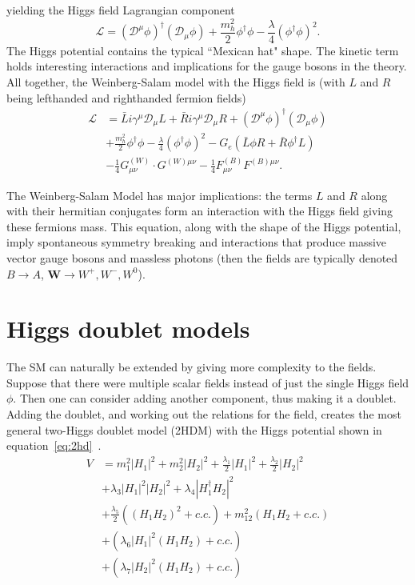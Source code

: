 yielding the Higgs field Lagrangian component 
\begin{equation}\mathcal{L} = (\mathcal{D}^\mu \phi)^\dag (\mathcal{D}_\mu \phi) + \frac{m^2_h}{2}\phi^\dag \phi - \frac{\lambda}{4}(\phi^\dag\phi)^2 \text{.}\end{equation} 
The Higgs potential contains the typical ``Mexican hat" shape. The kinetic term holds interesting interactions and implications for the gauge bosons in the theory. 
All together, the Weinberg-Salam model with the Higgs field is (with $L$ and $R$ being lefthanded and righthanded fermion fields)~\cite{Lancaster:1629337}
\begin{align}
\label{eq:ws}
\mathcal{L} &= \bar{L}i \gamma^\mu \mathcal{D}_\mu L +\bar{R}i \gamma^\mu \mathcal{D}_\mu R + (\mathcal{D}^\mu \phi)^\dag(\mathcal{D}_\mu\phi)  \\
            &+\frac{m^2_h}{2}\phi^\dag \phi - \frac{\lambda}{4}(\phi^\dag\phi)^2 - G_e(\bar{L}\phi R +\bar{R}\phi^\dag L)\nonumber \\
            &-\frac{1}{4}G^{(W)}_{\mu\nu}\cdot G^{(W)\mu\nu} - \frac{1}{4}F^{(B)}_{\mu\nu} F^{(B)\mu\nu}    \text{.} 
\end{align}

The Weinberg-Salam Model has major implications: the terms $L$ and $R$ along with their hermitian conjugates form an interaction with the Higgs field giving these fermions mass. 
This equation, along with the shape of the Higgs potential, imply spontaneous symmetry breaking and interactions that produce massive vector gauge bosons and massless photons (then the fields are typically denoted $B \rightarrow A$, $\bm{W}\rightarrow W^+,W^-,W^0$). 

\section{Higgs doublet models}
The SM can naturally be extended by giving more complexity to the fields. 
Suppose that there were multiple scalar fields instead of just the single Higgs field $\phi$. Then one can consider adding another component, thus making it a doublet. Adding the doublet, and working out the relations for the field, creates the most general two-Higgs doublet model (2HDM) with the Higgs potential shown in equation~\ref{eq:2hd}~\cite{Branco_2012}.
\begin{align} 
\label{eq:2hd}
V &= m^2_1|H_1|^2 + m^2_2|H_2|^2 + \frac{\lambda_1}{2}|H_1|^2 + \frac{\lambda_2}{2}|H_2|^2  \\
    &+\lambda_3|H_1|^2|H_2|^2 + \lambda_4|H^\dag_1 H_2|^2 \nonumber \\
    &+\frac{\lambda_5}{2}\left((H_1H_2)^2 + c.c.\right) +m^2_{12}\left(H_1 H_2 + c.c.\right) \nonumber \\
    &+\left(\lambda_6|H_1|^2(H_1 H_2) + c.c.\right) \nonumber \\
    &+\left(\lambda_7|H_2|^2(H_1 H_2) + c.c.\right) \nonumber 
\end{align}

